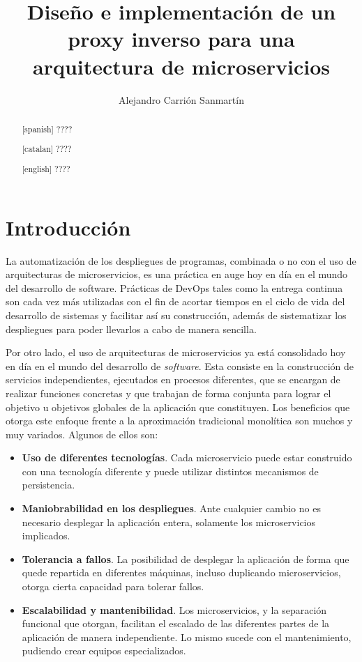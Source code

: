 \documentclass[11pt,spanish,listoffigures]{tfgetsinf}
\title{Diseño e implementación de un proxy inverso para una arquitectura de microservicios}
\author{Alejandro Carrión Sanmartín}
\begin{document}

\begin{abstract}[spanish]
????
\end{abstract}
\begin{abstract}[catalan]
????
\end{abstract}
\begin{abstract}[english]
????
\end{abstract}

\mainmatter


\chapter{Introducción}

La automatización de los despliegues de programas, combinada o no con el uso de arquitecturas de microservicios, es una práctica en auge hoy en día en el mundo del desarrollo de software. Prácticas de DevOps tales como la entrega continua son cada vez más utilizadas con el fin de acortar tiempos en el ciclo de vida del desarrollo de sistemas y facilitar así su construcción, además de sistematizar los despliegues para poder llevarlos a cabo de manera sencilla.

Por otro lado, el uso de arquitecturas de microservicios ya está consolidado hoy en día en el mundo del desarrollo de \emph{software}. Esta consiste en la construcción de servicios independientes, ejecutados en procesos diferentes, que se encargan de realizar funciones concretas y que trabajan de forma conjunta para lograr el objetivo u objetivos globales de la aplicación que constituyen. Los beneficios que otorga este enfoque frente a la aproximación tradicional monolítica son muchos y muy variados. Algunos de ellos son:

\begin{itemize}

	\item \textbf{Uso de diferentes tecnologías}. Cada microservicio puede estar construido con una tecnología diferente y puede utilizar distintos mecanismos de persistencia.

	\item \textbf{Maniobrabilidad en los despliegues}. Ante cualquier cambio no es necesario desplegar la aplicación entera, solamente los microservicios implicados.

	\item \textbf{Tolerancia a fallos}. La posibilidad de desplegar la aplicación de forma que quede repartida en diferentes máquinas, incluso duplicando microservicios, otorga cierta capacidad para tolerar fallos.

	\item \textbf{Escalabilidad y mantenibilidad}. Los microservicios, y la separación funcional que otorgan, facilitan el escalado de las diferentes partes de la aplicación de manera independiente. Lo mismo sucede con el mantenimiento, pudiendo crear equipos especializados.

\end{itemize}
\end{document}
